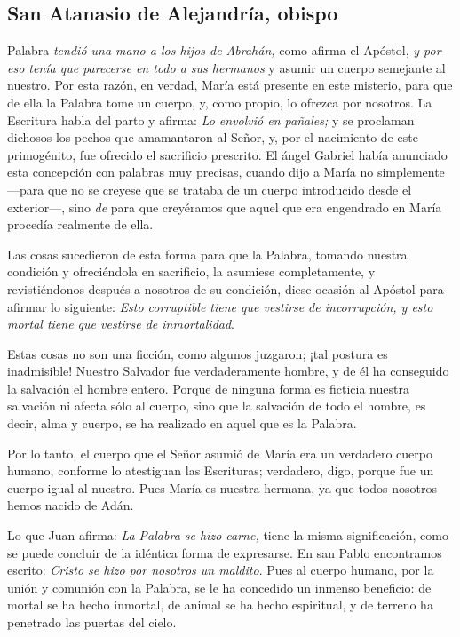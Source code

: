 \subsection{San Atanasio de Alejandría, obispo}



\begin{body}
	 Palabra \emph{tendió una mano a los hijos de Abrahán,} como afirma el Apóstol, \emph{y por eso tenía que parecerse en todo a sus hermanos} y asumir un cuerpo semejante al nuestro. Por esta razón, en verdad, María está presente en este misterio, para que de ella la Palabra tome un cuerpo, y, como propio, lo ofrezca por nosotros. La Escritura habla del parto y afirma: \emph{Lo envolvió en pañales;} y se proclaman dichosos los pechos que amamantaron al Señor, y, por el nacimiento de este primogénito, fue ofrecido el sacrificio prescrito. El ángel Gabriel había anunciado esta concepción con palabras muy precisas, cuando dijo a María no simplemente  ---para que no se creyese que se trataba de un cuerpo introducido desde el exterior---, sino \emph{de} para que creyéramos que aquel que era engendrado en María procedía realmente de ella.
	
	Las cosas sucedieron de esta forma para que la Palabra, tomando nuestra condición y ofreciéndola en sacrificio, la asumiese completamente, y revistiéndonos después a nosotros de su condición, diese ocasión al Apóstol para afirmar lo siguiente: \emph{Esto corruptible tiene que vestirse de incorrupción, y esto mortal tiene que vestirse de inmortalidad}.
	
	Estas cosas no son una ficción, como algunos juzgaron; ¡tal postura es inadmisible! Nuestro Salvador fue verdaderamente hombre, y de él ha conseguido la salvación el hombre entero. Porque de ninguna forma es ficticia nuestra salvación ni afecta sólo al cuerpo, sino que la salvación de todo el hombre, es decir, alma y cuerpo, se ha realizado en aquel que es la Palabra.
	
	Por lo tanto, el cuerpo que el Señor asumió de María era un verdadero cuerpo humano, conforme lo atestiguan las Escrituras; verdadero, digo, porque fue un cuerpo igual al nuestro. Pues María es nuestra hermana, ya que todos nosotros hemos nacido de Adán.
	
	Lo que Juan afirma: \emph{La Palabra se hizo carne,} tiene la misma significación, como se puede concluir de la idéntica forma de expresarse. En san Pablo encontramos escrito: \emph{Cristo se hizo por nosotros un maldito}. Pues al cuerpo humano, por la unión y comunión con la Palabra, se le ha concedido un inmenso beneficio: de mortal se ha hecho inmortal, de animal se ha hecho espiritual, y de terreno ha penetrado las puertas del cielo.
	

\end{body}
